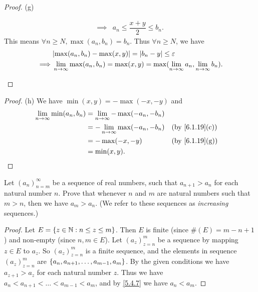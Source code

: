 \begin{proof}{(g)}
\begin{itemize}
\begin{align*}
            \implies & a_n \leq \dfrac{x + y}{2} \leq b_n.
          \end{align*}
          This means \(\forall n \geq N, \max(a_n, b_n) = b_n\).
          Thus \(\forall n \geq N\), we have
          \begin{align*}
                     & \abs{\max(a_n, b_n) - \max(x, y)} = \abs{b_n - y} \leq \varepsilon                                        \\
            \implies & \lim_{n \to \infty} \max(a_n, b_n) = \max(x, y) = \max(\lim_{n \to \infty} a_n, \lim_{n \to \infty} b_n).
          \end{align*}
  \end{itemize}
\end{proof}

\begin{proof}{(h)}
  We have \(\min(x, y) = -\max(-x, -y)\) and
  \begin{align*}
    \lim_{n \to \infty} \min(a_n, b_n) & = \lim_{n \to \infty} -\max(-a_n, -b_n)                                   \\
                                       & = -\lim_{n \to \infty} \max(-a_n, -b_n) &  & \text{(by \cref{6.1.19}(c))} \\
                                       & = -\max(-x, -y)                         &  & \text{(by \cref{6.1.19}(g))} \\
                                       & = \min(x, y).
  \end{align*}
\end{proof}

\exercisesection

\begin{ex}\label{ex:6.1.1}
  Let \((a_n)_{n = m}^\infty\) be a sequence of real numbers, such that \(a_{n + 1} > a_n\) for each natural number \(n\).
  Prove that whenever \(n\) and \(m\) are natural numbers such that \(m > n\), then we have \(a_m > a_n\).
  (We refer to these sequences as \emph{increasing} sequences.)
\end{ex}

\begin{proof}
  Let \(E = \left\lbrace z \in \mathbb{N} : n \leq z \leq m\right\rbrace\).
  Then \(E\) is finite (since \(\#(E) = m - n + 1\)) and non-empty (since \(n, m \in E\)).
  Let \((a_z)_{z = n}^m\) be a sequence by mapping \(z \in E\) to \(a_z\).
  So \((a_z)_{z = n}^m\) is a finite sequence, and the elements in sequence \((a_z)_{z = n}^m\) are \(\left\lbrace a_n, a_{n + 1}, \dots, a_{m - 1}, a_m\right\rbrace\).
  By the given conditions we have \(a_{z + 1} > a_z\) for each natural number \(z\).
  Thus we have \(a_n < a_{n + 1} < \dots < a_{m - 1} < a_m\), and by \cref{5.4.7} we have \(a_n < a_m\).
\end{proof}

